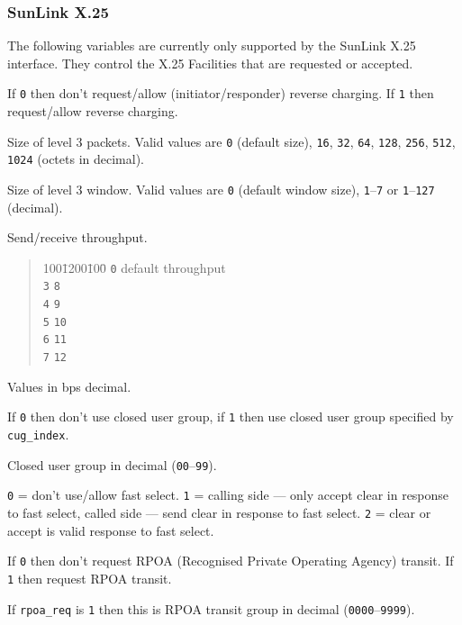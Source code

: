 \subsubsection{SunLink X.25}
The following variables are currently only supported by the
SunLink X.25 interface.
They control the X.25 Facilities that are requested or accepted.
\begin{describe}
\item[\verb"reverse\_charge"]  If \verb"0" then don't
request/allow (initiator/responder) reverse charging.
If \verb"1" then request/allow reverse charging.

\item[\verb"recvpktsize"/\verb"sendpktsize"] Size of level 3 packets.
Valid values are \verb"0" (default size),
\verb"16", \verb"32", \verb"64", \verb"128",
\verb"256", \verb"512", \verb"1024" (octets in decimal).

\item[\verb"recvwndsize"/\verb"sendwndsize"] Size of level 3 window.
Valid values are \verb"0" (default window size),
\verb"1"--\verb"7" or \verb"1"--\verb"127" (decimal).

\item[\verb"recvthruput"/\verb"sendthruput"] Send/receive throughput.
\nopagebreak
\begin{quote}
\begin{tabbing}
100\=1200\hspace{2em}\=100\=\kill
\verb"0"\> default throughput \\
\verb"3"\> \verb"8" \\
\verb"4"\> \verb"9" \\
\verb"5"\> \verb"10" \\
\verb"6"\> \verb"11" \\
\verb"7"\> \verb"12"  \\
\end{tabbing}
\end{quote}
Values in bps decimal.

\item[\verb"cug\_req"] If \verb"0" then don't use closed user group, if
\verb"1" then use closed user group specified by
\verb"cug_index".

\item[\verb"cug\_index"] Closed user group in decimal
(\verb"00"--\verb"99").

\item[\verb"fast\_select\_type"] \verb"0" = don't use/allow fast
select.
\verb"1" = calling side --- only accept clear in response to
fast select, called side --- send clear in response to fast
select.
\verb"2" = clear or accept is valid response to fast select.

\item[\verb"rpoa\_req"] If \verb"0" then don't request RPOA
(Recognised Private Operating Agency) transit.
If \verb"1" then request RPOA transit.

\item[\verb"rpoa"] If \verb"rpoa_req" is \verb"1" then this is
RPOA transit group in decimal (\verb"0000"--\verb"9999").
\end{describe}
